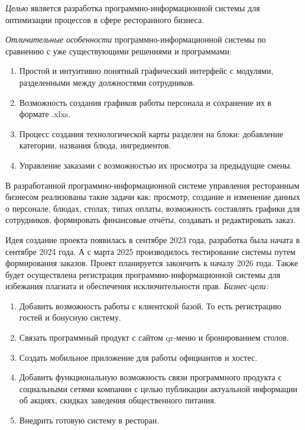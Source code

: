 \textit{Целью} является разработка программно-информационной системы для оптимизации процессов в сфере ресторанного бизнеса. 


\textit{Отличительные особенности} программно-информационной системы по сравнению с уже существующими решениями и программами:
\begin{enumerate}
	\item Простой и интуитивно понятный графический интерфейс с модулями, разделенными между должностями сотрудников.
	\item Возможность создания графиков работы персонала и сохранение их в формате .xlxs.
	\item Процесс создания технологической карты разделен на блоки: добавление категории, названия блюда, ингредиентов.
	\item Управление заказами с возможностью их просмотра за предыдущие смены.
\end{enumerate}


В разработанной программно-информационной системе управления ресторанным бизнесом реализованы такие задачи как: просмотр, создание и изменение данных о персонале, блюдах, столах, типах оплаты, возможность составлять графики для сотрудников, формировать финансовые отчёты, создавать и редактировать заказ.

Идея создание проекта появилась в сентябре 2023 года, разработка была начата в сентябре 2024 года. А с марта 2025 производилось тестирование системы путем формирования заказов. Проект планируется закончить к началу 2026 года. Также будет осуществлена регистрация программно-информационной системы для избежания плагиата и обеспечения исключительности прав.
\newpage
\textit{Бизнес-цели:}
 \begin{enumerate}
 	\item Добавить возможность работы с клиентской базой. То есть регистрацию гостей и бонусную систему.
 	\item Связать программный продукт с сайтом qr-меню и бронированием столов.
 	\item Создать мобильное приложение для работы официантов и хостес.
 	\item Добавить функциональную возможность связи программного продукта с социальными сетями компании с целью публикации актуальной информации об акциях, скидках заведения общественного питания.
 	\item Внедрить готовую систему в ресторан.
 \end{enumerate}




